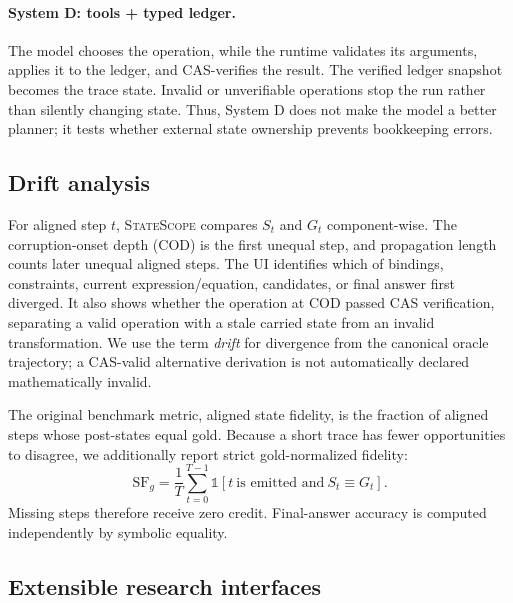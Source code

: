 \documentclass[11pt]{article}
\newcommand{\systemname}{\textsc{StateScope}}
\begin{document}
\paragraph{System D: tools + typed ledger.}
The model chooses the operation, while the runtime validates its arguments, applies
it to the ledger, and CAS-verifies the result.  The verified ledger snapshot becomes
the trace state.  Invalid or unverifiable operations stop the run rather than
silently changing state.  Thus, System D does not make the model a better planner;
it tests whether external state ownership prevents bookkeeping errors.

\subsection{Drift analysis}

For aligned step $t$, \systemname{} compares $S_t$ and $G_t$ component-wise.  The
corruption-onset depth (COD) is the first unequal step, and propagation length counts
later unequal aligned steps.  The UI identifies which of bindings, constraints,
current expression/equation, candidates, or final answer first diverged.  It also
shows whether the operation at COD passed CAS verification, separating a valid
operation with a stale carried state from an invalid transformation.  We use the
term \emph{drift} for divergence from the canonical oracle trajectory; a CAS-valid
alternative derivation is not automatically declared mathematically invalid.

The original benchmark metric, aligned state fidelity, is the fraction of aligned
steps whose post-states equal gold.  Because a short trace has fewer opportunities
to disagree, we additionally report strict gold-normalized fidelity:
\begin{equation}
 \mathrm{SF}_{g}=\frac{1}{T}\sum_{t=0}^{T-1}
 \mathbb{1}[t\ \text{is emitted and}\ S_t\equiv G_t].
 \label{eq:sfg}
\end{equation}
Missing steps therefore receive zero credit.  Final-answer accuracy is computed
independently by symbolic equality.

\subsection{Extensible research interfaces}
\end{document}
